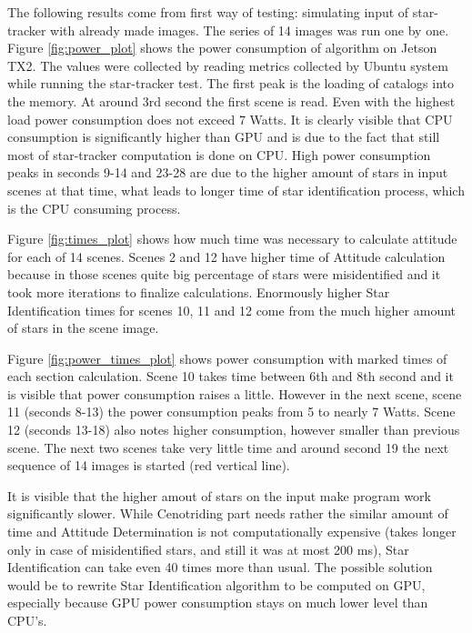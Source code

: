 \documentclass[12pt,a4paper,twoside]{article}
\begin{document}
The following results come from first way of testing: simulating input of star-tracker with already made images. The series of 14 images was run one by one. Figure \ref{fig:power_plot} shows the power consumption of algorithm on Jetson TX2. The values were collected by reading metrics collected by Ubuntu system while running the star-tracker test. The first peak is the loading of catalogs into the memory. At around 3rd second the first scene is read. Even with the highest load power consumption does not exceed 7 Watts. It is clearly visible that CPU consumption is significantly higher than GPU and is due to the fact that still most of star-tracker computation is done on CPU. High power consumption peaks in seconds 9-14 and 23-28 are due to the higher amount of stars in input scenes at that time, what leads to longer time of star identification process, which is the CPU consuming process.

Figure \ref{fig:times_plot} shows how much time was necessary to calculate attitude for each of 14 scenes. Scenes 2 and 12 have higher time of Attitude calculation because in those scenes quite big percentage of stars were misidentified and it took more iterations to finalize calculations. Enormously higher Star Identification times for scenes 10, 11 and 12 come from the much higher amount of stars in the scene image. 

Figure \ref{fig:power_times_plot} shows power consumption with marked times of each section calculation. Scene 10 takes time between 6th and 8th second and it is visible that power consumption raises a little. However in the next scene, scene 11 (seconds 8-13) the power consumption peaks from 5 to nearly 7 Watts. Scene 12 (seconds 13-18) also notes higher consumption, however smaller than previous scene. The next two scenes take very little time and around second 19 the next sequence of 14 images is started (red vertical line).

It is visible that the higher amout of stars on the input make program work significantly slower. While Cenotriding part needs rather the similar amount of time and Attitude Determination is not computationally expensive (takes longer only in case of misidentified stars, and still it was at most 200 ms), Star Identification can take even 40 times more than usual. The possible solution would be to rewrite Star Identification algorithm to be computed on GPU, especially because GPU power consumption stays on much lower level than CPU's.
\end{document}
